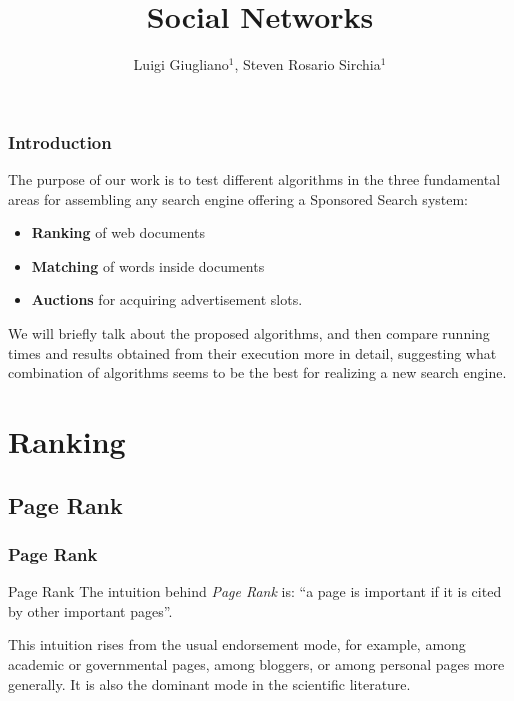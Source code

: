\documentclass{beamer}
\title{Social Networks}
\author{Luigi Giugliano$^1$, Steven Rosario Sirchia$^1$}
\institute{$^1$Università degli studi di Salerno}
\begin{document}
\begin{frame}
   \maketitle
\end{frame}

\begin{frame}
\frametitle{Introduction}
The purpose of our work is to test different algorithms in the three fundamental areas for assembling any search engine offering a Sponsored Search system:
\begin{itemize}
\item \textbf{Ranking} of web documents
\item \textbf{Matching} of words inside documents
\item \textbf{Auctions} for acquiring advertisement slots.
\end{itemize}
We will briefly talk about the proposed algorithms, and then compare running times and results obtained from their execution more in detail, suggesting what combination of algorithms seems to be the best for realizing a new search engine.
\end{frame}




\section{Ranking}
\subsection{Page Rank}
\begin{frame}
\frametitle{Page Rank}
\begin{block}{Page Rank}
The intuition behind \emph{Page Rank} is:
\center``a page is important if it is cited by other important pages''.
\end{block}
This intuition rises from the usual endorsement mode, for example, among academic or governmental pages, among bloggers, or among personal pages more generally. It is also the dominant mode in the scientific literature.
\end{frame}
\end{document}
